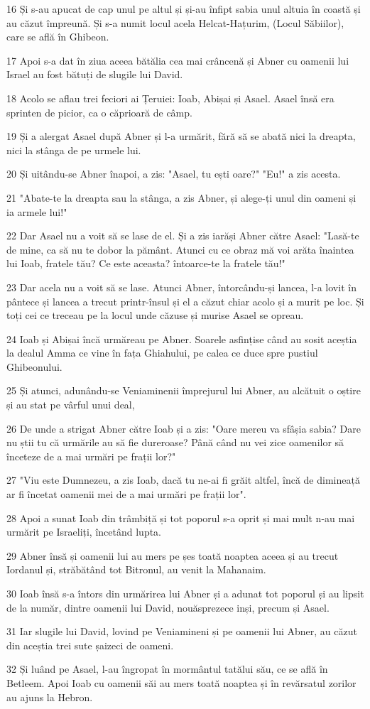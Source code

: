 \par 16 Și s-au apucat de cap unul pe altul și și-au înfipt sabia unul altuia în coastă și au căzut împreună. Și s-a numit locul acela Helcat-Hațurim, (Locul Săbiilor), care se află în Ghibeon.
\par 17 Apoi s-a dat în ziua aceea bătălia cea mai crâncenă și Abner cu oamenii lui Israel au fost bătuți de slugile lui David.
\par 18 Acolo se aflau trei feciori ai Țeruiei: Ioab, Abișai și Asael. Asael însă era sprinten de picior, ca o căprioară de câmp.
\par 19 Și a alergat Asael după Abner și l-a urmărit, fără să se abată nici la dreapta, nici la stânga de pe urmele lui.
\par 20 Și uitându-se Abner înapoi, a zis: "Asael, tu ești oare?" "Eu!" a zis acesta.
\par 21 "Abate-te la dreapta sau la stânga, a zis Abner, și alege-ți unul din oameni și ia armele lui!"
\par 22 Dar Asael nu a voit să se lase de el. Și a zis iarăși Abner către Asael: "Lasă-te de mine, ca să nu te dobor la pământ. Atunci cu ce obraz mă voi arăta înaintea lui Ioab, fratele tău? Ce este aceasta? întoarce-te la fratele tău!"
\par 23 Dar acela nu a voit să se lase. Atunci Abner, întorcându-și lancea, l-a lovit în pântece și lancea a trecut printr-însul și el a căzut chiar acolo și a murit pe loc. Și toți cei ce treceau pe la locul unde căzuse și murise Asael se opreau.
\par 24 Ioab și Abișai încă urmăreau pe Abner. Soarele asfințise când au sosit aceștia la dealul Amma ce vine în fața Ghiahului, pe calea ce duce spre pustiul Ghibeonului.
\par 25 Și atunci, adunându-se Veniaminenii împrejurul lui Abner, au alcătuit o oștire și au stat pe vârful unui deal,
\par 26 De unde a strigat Abner către Ioab și a zis: "Oare mereu va sfâșia sabia? Dare nu știi tu că urmările au să fie dureroase? Până când nu vei zice oamenilor să înceteze de a mai urmări pe frații lor?"
\par 27 "Viu este Dumnezeu, a zis Ioab, dacă tu ne-ai fi grăit altfel, încă de dimineață ar fi încetat oamenii mei de a mai urmări pe frații lor".
\par 28 Apoi a sunat Ioab din trâmbiță și tot poporul s-a oprit și mai mult n-au mai urmărit pe Israeliți, încetând lupta.
\par 29 Abner însă și oamenii lui au mers pe șes toată noaptea aceea și au trecut Iordanul și, străbătând tot Bitronul, au venit la Mahanaim.
\par 30 Ioab însă s-a întors din urmărirea lui Abner și a adunat tot poporul și au lipsit de la număr, dintre oamenii lui David, nouăsprezece inși, precum și Asael.
\par 31 Iar slugile lui David, lovind pe Veniamineni și pe oamenii lui Abner, au căzut din aceștia trei sute șaizeci de oameni.
\par 32 Și luând pe Asael, l-au îngropat în mormântul tatălui său, ce se află în Betleem. Apoi Ioab cu oamenii săi au mers toată noaptea și în revărsatul zorilor au ajuns la Hebron.

